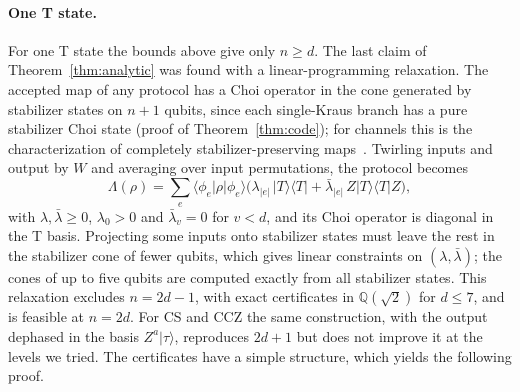 \documentclass[aps,prl,reprint,twocolumn,amsmath,amssymb,floatfix,nofootinbib,superscriptaddress]{revtex4-2}
\begin{document}
\paragraph*{One T state.}
For one T state the bounds above give only $n\geq d$. The last claim of Theorem~\ref{thm:analytic} was found with a linear-programming relaxation. The accepted map of any protocol has a Choi operator in the cone generated by stabilizer states on $n+1$ qubits, since each single-Kraus branch has a pure stabilizer Choi state (proof of Theorem~\ref{thm:code}); for channels this is the characterization of completely stabilizer-preserving maps~\cite[Theorem~3.1]{seddoncampbell}. Twirling inputs and output by $W$ and averaging over input permutations, the protocol becomes
\begin{equation}
 \Lambda(\rho)=\sum_e\langle\phi_e|\rho|\phi_e\rangle\bigl(\lambda_{|e|}\,|T\rangle\langle T|+\bar\lambda_{|e|}\,Z|T\rangle\langle T|Z\bigr),
 \label{eq:tform}
\end{equation}
with $\lambda,\bar\lambda\geq0$, $\lambda_0>0$ and $\bar\lambda_v=0$ for $v<d$, and its Choi operator is diagonal in the T basis. Projecting some inputs onto stabilizer states must leave the rest in the stabilizer cone of fewer qubits, which gives linear constraints on $(\lambda,\bar\lambda)$; the cones of up to five qubits are computed exactly from all stabilizer states. This relaxation excludes $n=2d-1$, with exact certificates in $\mathbb Q(\sqrt2)$ for $d\leq7$, and is feasible at $n=2d$. For CS and CCZ the same construction, with the output dephased in the basis $Z^a|\tau\rangle$, reproduces $2d+1$ but does not improve it at the levels we tried. The certificates have a simple structure, which yields the following proof.
\end{document}
